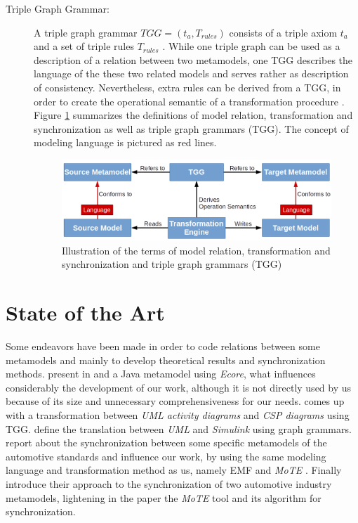 \documentclass[tuberlin,cic,tc,english,noabntcite]{iiufrgs}
\begin{document}
\begin{description}
	\item[Triple Graph Grammar:] A triple graph grammar $TGG = (t_a, T_{rules}) $ consists of a triple axiom $t_a$ and a set of triple rules $T_{rules}$ \citep[p. 4]{giese2010toward}. While one triple graph can be used as a description of a relation between two metamodels, one TGG describes the language of the these two related models and serves rather as description of consistency. Nevertheless, extra rules can be derived from a TGG, in order to create the operational semantic of a transformation procedure \citep{giese2010toward}. Figure \ref{fig:transformation_scheme} summarizes the definitions of model relation, transformation and synchronization as well as triple graph grammars (TGG). The concept of modeling language is pictured as red lines.

	\begin{figure}[h]
	    \caption{Illustration of the terms of model relation, transformation and synchronization and triple graph grammars (TGG)}
	    \begin{center}
	        \includegraphics[width=.7\textwidth]{transformation_scheme}
	    \end{center}
	    \label{fig:transformation_scheme}
	\end{figure}
\end{description}

\chapter{State of the Art}
Some endeavors have been made in order to code relations between some metamodels and mainly to develop theoretical results and synchronization methods. \citeauthor{heidenreich2010closing} present in \citeyearpar{heidenreich2009jamopp} and \citeyearpar{heidenreich2010closing} a Java metamodel using \emph{Ecore}, what influences considerably the development of our work, although it is not directly used by us because of its size and unnecessary comprehensiveness for our needs. \citet{greenyer2008tggs} comes up with a transformation between \emph{UML activity diagrams} and \emph{CSP diagrams} using TGG. \citet{foss2011uml} define the translation between \emph{UML} and \emph{Simulink} using graph grammars. \citet{blouin2014synchronization} report about the synchronization between some specific metamodels of the automotive standards and influence our work, by using the same modeling language and transformation method as us, namely EMF \citep{steinberg2008emf} and \emph{MoTE} \citep{giese2010toward}. Finally \citet{giese2010model} introduce their approach to the synchronization of two automotive industry metamodels, lightening in the paper the \emph{MoTE} tool and its algorithm for synchronization.
\end{document}
